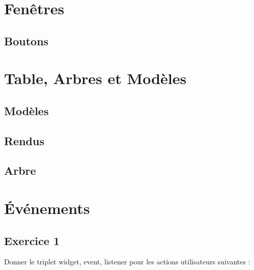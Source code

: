 \documentclass[12pt,a4paper,openany]{book}
\begin{document}
	\thispagestyle{empty} %
	\titleBC 
	\setcounter{tocdepth}{2}
	\setcounter{secnumdepth}{3}
	\tableofcontents
	\chapter{Fenêtres}
	
	
	\section{Boutons}
	
	\chapter{Table, Arbres et Modèles}
	\section{Modèles}
	
	
	\section{Rendus}
	
	\section{Arbre}
	

	\chapter{Événements}
	\section{Exercice 1}
	Donner le triplet widget, event, listener pour les actions utilisateurs suivantes : 
\end{document}
